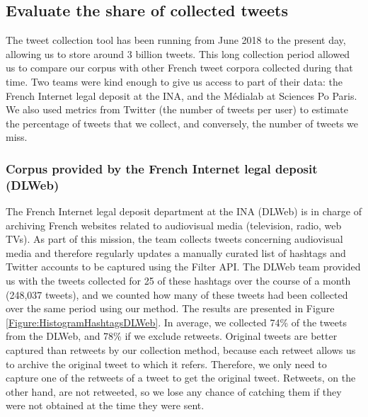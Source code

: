 \subsection{Evaluate the share of collected tweets}

The tweet collection tool has been running from June 2018 to the present day, allowing us to store around 3 billion tweets. This long collection period allowed us to compare our corpus with other French tweet corpora collected during that time. Two teams were kind enough to give us access to part of their data: the French Internet legal deposit at the INA, and the Médialab at Sciences Po Paris. We also used metrics from Twitter (the number of tweets per user) to estimate the percentage of tweets that we collect, and conversely, the number of tweets we miss.

\subsubsection{Corpus provided by the French Internet legal deposit (DLWeb)}


The French Internet legal deposit department at the INA (DLWeb) is in charge of archiving French websites related to audiovisual media (television, radio, web TVs). As part of this mission, the team collects tweets concerning audiovisual media and therefore regularly updates a manually curated list of hashtags and Twitter accounts to be captured using the Filter API. The DLWeb team provided us with the tweets collected for 25 of these hashtags over the course of a month (248,037 tweets), and we counted how many of these tweets had been collected over the same period using our method. The results are presented in Figure \ref{Figure:HistogramHashtagsDLWeb}. In average, we collected 74\% of the tweets from the DLWeb, and 78\% if we exclude retweets. Original tweets are better captured than retweets by our collection method, because each retweet allows us to archive the original tweet to which it refers. Therefore, we only need to capture one of the retweets of a tweet to get the original tweet. Retweets, on the other hand, are not retweeted, so we lose any chance of catching them if they were not obtained at the time they were sent.

